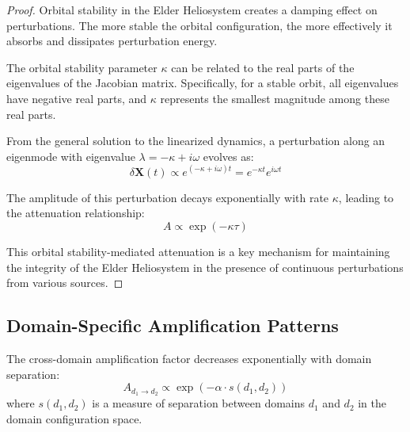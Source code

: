 \begin{proof}
Orbital stability in the Elder Heliosystem creates a damping effect on perturbations. The more stable the orbital configuration, the more effectively it absorbs and dissipates perturbation energy.

The orbital stability parameter $\kappa$ can be related to the real parts of the eigenvalues of the Jacobian matrix. Specifically, for a stable orbit, all eigenvalues have negative real parts, and $\kappa$ represents the smallest magnitude among these real parts.

From the general solution to the linearized dynamics, a perturbation along an eigenmode with eigenvalue $\lambda = -\kappa + i\omega$ evolves as:
\begin{equation}
\delta\mathbf{X}(t) \propto e^{(-\kappa + i\omega)t} = e^{-\kappa t} e^{i\omega t}
\end{equation}

The amplitude of this perturbation decays exponentially with rate $\kappa$, leading to the attenuation relationship:
\begin{equation}
A \propto \exp(-\kappa \tau)
\end{equation}

This orbital stability-mediated attenuation is a key mechanism for maintaining the integrity of the Elder Heliosystem in the presence of continuous perturbations from various sources.
\end{proof}

\subsection{Domain-Specific Amplification Patterns}

\begin{theorem}
The cross-domain amplification factor decreases exponentially with domain separation:
\begin{equation}
A_{d_1 \to d_2} \propto \exp(-\alpha \cdot s(d_1, d_2))
\end{equation}
where $s(d_1, d_2)$ is a measure of separation between domains $d_1$ and $d_2$ in the domain configuration space.
\end{theorem}

